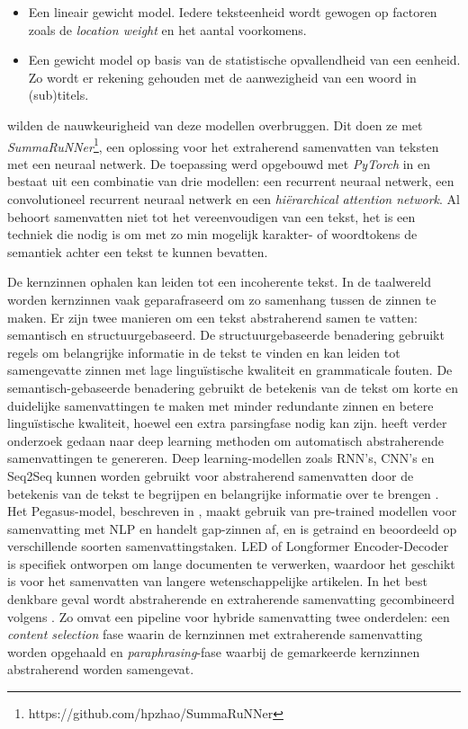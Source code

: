 \begin{itemize}
	\item Een lineair gewicht model. Iedere teksteenheid wordt gewogen op factoren zoals de \textit{location weight} en het aantal voorkomens.
	\item Een gewicht model op basis van de statistische opvallendheid van een eenheid. Zo wordt er rekening gehouden met de aanwezigheid van een woord in (sub)titels.
\end{itemize}

\textcite{Nallapati2017} wilden de nauwkeurigheid van deze modellen overbruggen. Dit doen ze met \textit{SummaRuNNer}\footnote{https://github.com/hpzhao/SummaRuNNer}, een oplossing voor het extraherend samenvatten van teksten met een neuraal netwerk. De toepassing werd opgebouwd met \textit{PyTorch} in  en bestaat uit een combinatie van drie modellen: een recurrent neuraal netwerk, een convolutioneel recurrent neuraal netwerk en een \textit{hiërarchical attention network}. Al behoort samenvatten niet tot het vereenvoudigen van een tekst, het is een techniek die nodig is om met zo min mogelijk karakter- of woordtokens de semantiek achter een tekst te kunnen bevatten. 

\medspace

De kernzinnen ophalen kan leiden tot een incoherente tekst. In de taalwereld worden kernzinnen vaak geparafraseerd om zo samenhang tussen de zinnen te maken. Er zijn twee manieren om een tekst abstraherend samen te vatten: semantisch en structuurgebaseerd. De structuurgebaseerde benadering gebruikt regels om belangrijke informatie in de tekst te vinden en kan leiden tot samengevatte zinnen met lage linguïstische kwaliteit en grammaticale fouten. De semantisch-gebaseerde benadering gebruikt de betekenis van de tekst om korte en duidelijke samenvattingen te maken met minder redundante zinnen en betere linguïstische kwaliteit, hoewel een extra parsingfase nodig kan zijn. \textcite{Cao2022} heeft verder onderzoek gedaan naar deep learning methoden om automatisch abstraherende samenvattingen te genereren. Deep learning-modellen zoals RNN's, CNN's en Seq2Seq kunnen worden gebruikt voor abstraherend samenvatten door de betekenis van de tekst te begrijpen en belangrijke informatie over te brengen \autocite{Suleiman2020}. Het Pegasus-model, beschreven in \textcite{Zhang2020}, maakt gebruik van pre-trained modellen voor samenvatting met NLP en handelt gap-zinnen af, en is getraind en beoordeeld op verschillende soorten samenvattingstaken. LED of Longformer Encoder-Decoder is specifiek ontworpen om lange documenten te verwerken, waardoor het geschikt is voor het samenvatten van langere wetenschappelijke artikelen. In het best denkbare geval wordt abstraherende en extraherende samenvatting gecombineerd volgens \textcite{Hsu2018, Huang2019}. Zo omvat een pipeline voor hybride samenvatting twee onderdelen: een \textit{content selection} fase waarin de kernzinnen met extraherende samenvatting worden opgehaald en \textit{paraphrasing}-fase waarbij de gemarkeerde kernzinnen abstraherend worden samengevat. 

